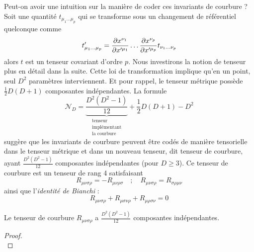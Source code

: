 \documentclass[a4paper,11pt]{report}
\begin{document}
            Peut-on avoir une intuition sur la manière de coder ces invariants de courbure ? Soit une quantité $t_{\mu_1\dots\mu_p}$ qui se transforme sous un changement de référentiel quelconque comme
            \begin{equation}
                t'_{\mu_1\dots\mu_p} = \frac{\partial x^{\nu_1}}{\partial x'^{\mu_1}}\dots\frac{\partial x^{\nu_p}}{\partial x'^{\mu_p}} t_{\nu_1\dots\nu_p}
            \end{equation}
            alors $t$ est un tenseur covariant d'ordre $p$. Nous investirons la notion de tenseur plus en détail dans la suite. Cette loi de transformation implique qu'en un point, seul $D^2$ paramètres interviennent. Et pour rappel, le tenseur métrique possède $\frac{1}{2}D(D+1)$ composantes indépendantes. La formule
            \begin{equation}
                \mathscr{N}_D =  \underbrace{\frac{D^2(D^2-1)}{12}}_{\substack{\text{tenseur}\\ \text{implémentant} \\ \text{la courbure}}}+\frac{1}{2}D(D+1)-D^2
            \end{equation}
            suggère que les invariants de courbure peuvent être codés de manière tensorielle dans le tenseur métrique et dans un nouveau tenseur, dit tenseur de courbure, ayant $\frac{D^2(D^2-1)}{12}$ composantes indépendantes (pour $D\geq3$). Ce tenseur de courbure est un tenseur de rang 4 satisfaisant 
            \begin{equation}
                R_{\mu\nu\sigma\rho} = -R_{\mu\nu\rho\sigma}\quad ; \quad R_{\mu\nu\sigma\rho} = R_{\sigma\rho\mu\nu}
            \end{equation}
            ainsi que l'\textit{identité de Bianchi} :
            \begin{equation}
                R_{\mu\nu\sigma\rho}+R_{\mu\sigma\nu\rho}+R_{\mu\rho\sigma\nu} = 0
            \end{equation}
            
            \begin{prop}\begin{leftbar}
                Le tenseur de courbure $R_{\mu\nu\sigma\rho}$ a $\frac{D^2(D^2-1)}{12}$ composantes indépendantes.
            \end{leftbar}\end{prop}
            
            \begin{proof}${}$\\
                \comp
            \end{proof}
            
\end{document}

